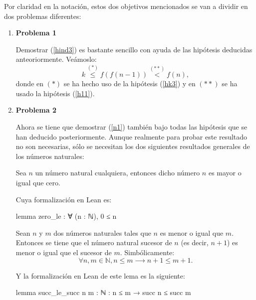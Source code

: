 \begin{demostracion}
\begin{itemize}
      Por claridad en la notación, estos dos objetivos mencionados
      se van a dividir en dos problemas diferentes:
      \begin{enumerate}
      \item \textbf{Problema 1}

        Demostrar (\ref{hind3}) es bastante sencillo con ayuda de
        las hipótesis deducidas anteoriormente. Veámoslo:
        \begin{equation}
          k\stackrel{(*)}{≤}f(f(n-1))\stackrel{(**)}{<}f(n),
        \end{equation}
        donde en \((*)\) se ha hecho uso de la hipótesis (\ref{hk3})
        y en \((**)\) se ha usado la hipótesis (\ref{h11}).

      \item \textbf{Problema 2}

        Ahora se tiene que demostrar (\ref{n1}) también bajo todas
        las hipótesis que se han deducido posteriormente. Aunque
        realmente para probar este resultado no son necesarias,
        sólo se necesitan los dos siguientes resultados generales
        de los números naturales:

        \begin{lema}\label{lemaNatCero}
          Sea \(n\) un número natural cualquiera, entonces dicho
          número \(n\) es mayor o igual que cero.
        \end{lema}

        Cuya formalización en Lean es:
        \begin{leancode}
          lemma zero_le : ∀ (n : ℕ), 0 ≤ n
        \end{leancode}

        \begin{lema}\label{lemaNatSuc}
          Sean \(n\) y \(m\) dos números naturales tales que \(n\)
          es menor o igual que \(m\). Entonces se tiene que el
          número natural sucesor de \(n\) (es decir, \(n+1\)) es
          menor o igual que el sucesor de \(m\). Simbólicamente:
          \begin{equation}
            ∀n,m ∈ ℕ, n≤m ⟶ n+1≤m+1.
          \end{equation}
        \end{lema}

        Y la formalización en Lean de este lema es la siguiente:
        \begin{leancode}
          lemma succ_le_succ {n m : ℕ} : n ≤ m → succ n ≤ succ m
        \end{leancode}


\end{enumerate}
\end{itemize}
\end{demostracion}
